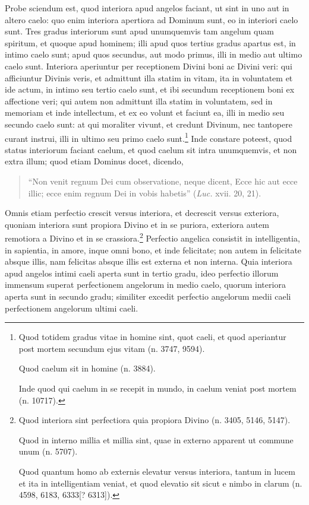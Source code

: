\begin{topic}{33}
    Probe sciendum est, quod interiora apud angelos faciant, ut sint in uno aut in altero caelo: quo enim interiora
    apertiora ad Dominum sunt, eo in interiori caelo sunt.
    Tres gradus interiorum sunt apud unumquemvis tam angelum quam spiritum, et quoque apud hominem; illi apud quos
    tertius gradus apartus est, in intimo caelo sunt; apud quos secundus, aut modo primus, illi in medio aut ultimo
    caelo sunt.
    Interiora aperiuntur per receptionem Divini boni ac Divini veri: qui afficiuntur Divinis veris, et admittunt illa
    statim in vitam, ita in voluntatem et ide actum, in intimo seu tertio caelo sunt, et ibi secundum receptionem boni
    ex affectione veri; qui autem non admittunt illa statim in voluntatem, sed in memoriam et inde intellectum, et ex eo
    volunt et faciunt ea, illi in medio seu secundo caelo sunt: at qui moraliter vivunt, et credunt Divinum, nec
    tantopere curant instrui, illi in ultimo seu primo caelo sunt.\footnote{Quod totidem gradus vitae in homine sint,
    quot caeli, et quod aperiantur post mortem secundum ejus vitam (n. 3747, 9594).

    Quod caelum sit in homine (n. 3884).

    Inde quod qui caelum in se recepit in mundo, in caelum veniat post mortem (n. 10717).}
    Inde constare poteest, quod status interiorum faciant caelum, et quod caelum sit intra unumquemvis, et non extra
    illum; quod etiam Dominus docet, dicendo,
    \begin{quote}
        ``Non venit regnum Dei cum observatione, neque dicent, Ecce hic aut ecce illic; ecce enim regnum Dei in vobis
        habetis'' (\emph{Luc.} xvii. 20, 21).
    \end{quote}
\end{topic}

\begin{topic}{34}
    Omnis etiam perfectio crescit versus interiora, et decrescit versus exteriora, quoniam interiora sunt propiora
    Divino et in se puriora, exteriora autem remotiora a Divino et in se crassiora.\footnote{Quod interiora sint
    perfectiora quia propiora Divino (n. 3405, 5146, 5147).

    Quod in interno millia et millia sint, quae in externo apparent ut commune unum (n. 5707).

    Quod quantum homo ab externis elevatur versus interiora, tantum in lucem et ita in intelligentiam veniat, et quod
    elevatio sit sicut e nimbo in clarum (n. 4598, 6183, 6333[? 6313]).}
    Perfectio angelica consistit in intelligentia, in sapientia, in amore, inque omni bono, et inde felicitate; non
    autem in felicitate absque illis, nam felicitas absque illis est externa et non interna.
    Quia interiora apud angelos intimi caeli aperta sunt in tertio gradu, ideo perfectio illorum immensum superat
    perfectionem angelorum in medio caelo, quorum interiora aperta sunt in secundo gradu; similiter excedit perfectio
    angelorum medii caeli perfectionem angelorum ultimi caeli.
\end{topic}


